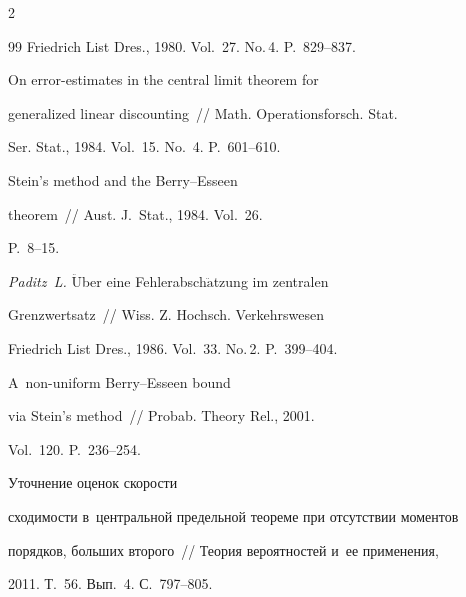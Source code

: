 \begin{multicols}{2}
{{\begin{thebibliography}{99}
Friedrich List Dres., 1980. Vol.~27. No.\,4. P.~829--837.







 On error-estimates in the central limit theorem for


generalized linear discounting~// Math. Operationsforsch. Stat. 


Ser. Stat., 1984. Vol.~15. No.~4. P.~601--610.







 Stein's method and the Berry--Esseen


theorem~// Aust. J.~Stat., 1984. Vol.~26.


P.~8--15.







{\it Paditz~L.} $\ddot{\mbox{U}}$ber eine Fehlerabsch$\ddot{\mbox{a}}$tzung im zentralen


Grenzwertsatz~// Wiss. Z. Hochsch. Verkehrswesen


Friedrich List Dres., 1986. Vol.~33. No.\,2. P.~399--404.













 A~non-uniform Berry--Esseen bound


via Stein's method~// Probab. Theory Rel., 2001.


Vol.~120. P.~236--254.







 Уточнение оценок ско\-рости


сходимости в~центральной предельной теореме при отсутствии моментов


порядков, больших второго~// Тео\-рия вероятностей и~ее применения,


2011. Т.~56. Вып.~4. С.~797--805.








\end{thebibliography}}}
\end{multicols}

